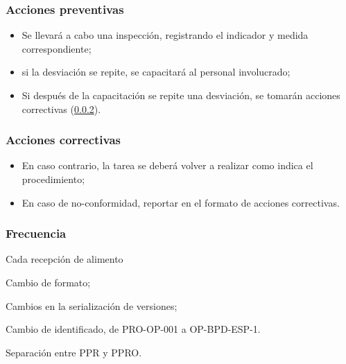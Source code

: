 \subsubsection{Acciones preventivas}

\begin{itemize}
	\item Se llevará a cabo una inspección, registrando el indicador y medida correspondiente;
	\item si la desviación se repite, se capacitará al personal involucrado;
	\item Si después de la capacitación se repite una desviación, se tomarán acciones correctivas (\cref{sec:2.1:acc}).
\end{itemize}

\subsubsection{Acciones correctivas}
\label{sec:2.1:acc}
\begin{itemize}
	\item En caso contrario, la tarea se deberá volver a realizar como indica el procedimiento;
	\item En caso de no-conformidad, reportar en el formato de acciones correctivas.
\end{itemize}

\subsubsection{Frecuencia}

Cada recepción de \gls{alimento}

\begin{changelog}[simple, sectioncmd=\subsection*,label=changelog-\thesection-\MayorVer.\MenorVer]
	\begin{version}[v=\MayorVer.\MenorVer, date=2023--01, author=Pablo E. Alanis]
		\item Cambio de formato;
		\item Cambios en la serialización de versiones;
		\item Cambio de identificado, de PRO-OP-001 a OP-BPD-ESP-1.
		\item Separación entre PPR y PPRO.
	\end{version}
\end{changelog}